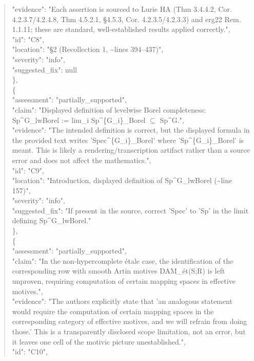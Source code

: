 \documentclass[11pt]{article}
\begin{document}
\begin{quote}
      "evidence": "Each assertion is sourced to Lurie HA (Thm 3.4.4.2, Cor. 4.2.3.7/4.2.4.8, Thm 4.5.2.1, §4.5.3, Cor. 4.2.3.5/4.2.3.3) and erg22 Rem. 1.1.11; these are standard, well-established results applied correctly.",\\
      "id": "C8",\\
      "location": "§2 (Recollection 1, \~{}lines 394--437)",\\
      "severity": "info",\\
      "suggested\_fix": null\\
    \},\\
    \{\\
      "assessment": "partially\_supported",\\
      "claim": "Displayed definition of levelwise Borel completeness: Sp\^{}G\_lwBorel := lim\_i Sp\^{}\{G\_i\}\_Borel \ensuremath{\subseteq} Sp\^{}G.",\\
      "evidence": "The intended definition is correct, but the displayed formula in the provided text writes 'Spec\^{}\{G\_i\}\_Borel' where 'Sp\^{}\{G\_i\}\_Borel' is meant. This is likely a rendering/transcription artifact rather than a source error and does not affect the mathematics.",\\
      "id": "C9",\\
      "location": "Introduction, displayed definition of Sp\^{}G\_lwBorel (\~{}line 157)",\\
      "severity": "info",\\
      "suggested\_fix": "If present in the source, correct 'Spec' to 'Sp' in the limit defining Sp\^{}G\_lwBorel."\\
    \},\\
    \{\\
      "assessment": "partially\_supported",\\
      "claim": "In the non-hypercomplete étale case, the identification of the corresponding row with smooth Artin motives DAM\_ét(S;R) is left unproven, requiring computation of certain mapping spaces in effective motives.",\\
      "evidence": "The authors explicitly state that 'an analogous statement would require the computation of certain mapping spaces in the corresponding category of effective motives, and we will refrain from doing those.' This is a transparently disclosed scope limitation, not an error, but it leaves one cell of the motivic picture unestablished.",\\
      "id": "C10",\\

\end{quote}
\end{document}
